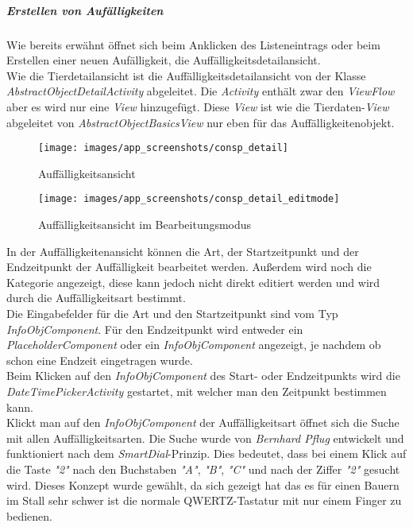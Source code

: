 \subparagraph{Erstellen von Aufälligkeiten}
Wie bereits erwähnt öffnet sich beim Anklicken des Listeneintrags oder beim Erstellen einer neuen Aufälligkeit, die Auffälligkeitsdetailansicht. \\
Wie die Tierdetailansicht ist die Auffälligkeitsdetailansicht von der Klasse \textit{AbstractObjectDetailActivity} abgeleitet. Die \textit{Activity} enthält zwar den \textit{ViewFlow} aber es wird nur eine \textit{View} hinzugefügt. Diese \textit{View} ist wie die Tierdaten-\textit{View} abgeleitet von \textit{AbstractObjectBasicsView} nur eben für das Auffälligkeitenobjekt. 
\begin{figure}[H]
  \centering
  \begin{minipage}[t]{7 cm}
  	\centering
  	\texttt{[image: images/app\_screenshots/consp\_detail]} 
    \caption{Auffälligkeitsansicht}
  \end{minipage}
  \hspace{0.5cm}
  \begin{minipage}[t]{7 cm}
	\centering
	\texttt{[image: images/app\_screenshots/consp\_detail\_editmode]}  
    \caption{Auffälligkeitsansicht im Bearbeitungsmodus}
  \end{minipage}
\end{figure}
In der Auffälligkeitenansicht können die Art, der Startzeitpunkt und der Endzeitpunkt der Auffälligkeit bearbeitet werden. Außerdem wird noch die Kategorie angezeigt, diese kann jedoch nicht direkt editiert werden und wird durch die Auffälligkeitsart bestimmt. \\
Die Eingabefelder für die Art und den Startzeitpunkt sind vom Typ \textit{InfoObjComponent}. Für den Endzeitpunkt wird entweder ein \textit{PlaceholderComponent} oder ein \textit{InfoObjComponent} angezeigt, je nachdem ob schon eine Endzeit eingetragen wurde. \\
Beim Klicken auf den \textit{InfoObjComponent} des Start- oder Endzeitpunkts wird die \textit{DateTimePickerActivity} gestartet, mit welcher man den Zeitpunkt bestimmen kann. \\
Klickt man auf den \textit{InfoObjComponent} der Auffälligkeitsart öffnet sich die Suche mit allen Auffälligkeitsarten. Die Suche wurde von \textit{Bernhard Pflug} entwickelt und funktioniert nach dem \textit{SmartDial}-Prinzip. Dies bedeutet, dass bei einem Klick auf die Taste \textit{"2"} nach den Buchstaben \textit{"A"}, \textit{"B"}, \textit{"C"} und nach der Ziffer \textit{"2"} gesucht wird. Dieses Konzept wurde gewählt, da sich gezeigt hat das es für einen Bauern im Stall sehr schwer ist die normale QWERTZ-Tastatur mit nur einem Finger zu bedienen. \\

